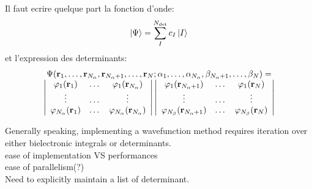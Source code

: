 \alert{ Il faut ecrire quelque part la fonction d'onde:
$$ \ket{\Psi} = \sum_I^{N_\text{det}} c_I {\ket*{I}} $$
et l'expression des determinants:
\begin{equation}
\begin{array}{c}
 \Psi({\bf r}_1,\dots,{\bf r}_{{N_\alpha}},{\bf r}_{{N_\alpha}+1},\dots,{\bf r}_N;
      \alpha_1,\dots,\alpha_{{N_\alpha}},\beta_{{N_\alpha}+1},\dots,\beta_N) = \\
\left|
 \begin{array}{ccc}
 \varphi_1({\bf r}_1) & \dots & \varphi_1({\bf r}_{{N_\alpha}}) \\
 \vdots               & \dots &   \vdots             \\
 \varphi_{{N_\alpha}}({\bf r}_1) & \dots & \varphi_{{N_\alpha}}({\bf r}_{{N_\alpha}}) \\
 \end{array}
\right|
\left|
 \begin{array}{ccc}
 \varphi_1({\bf r}_{{N_\alpha}+1}) & \dots & \varphi_1({\bf r}_{N}) \\
 \vdots               & \dots &   \vdots             \\
 \varphi_{N_\beta}({\bf r}_{{N_\alpha}+1}) & \dots & \varphi_{N_\beta}({\bf r}_{N}) \\
 \end{array}
\right|
\end{array} 
\label{eq:slater}
\end{equation}
}

Generally speaking, implementing a wavefunction method requires iteration over either bielectronic integrals or determinants. \\
ease of implementation VS performances \\
ease of parallelism(?) \\
Need to explicitly maintain a list of determinant. \\




